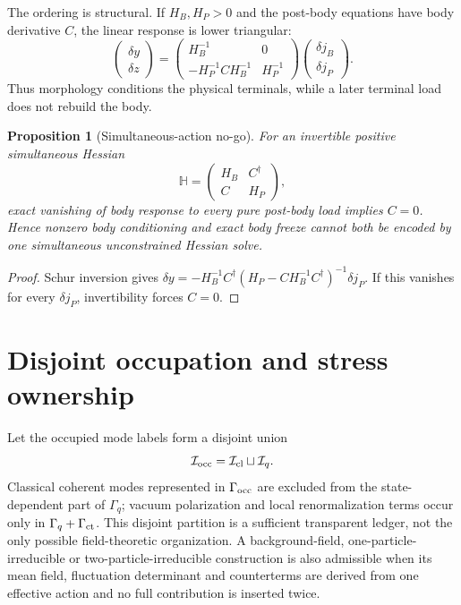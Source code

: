\documentclass[11pt]{article}
\newtheorem{proposition}{Proposition}
\begin{document}
The ordering is structural. If $H_B,H_P>0$ and the post-body equations have
body derivative $C$, the linear response is lower triangular:
\begin{equation}
\begin{pmatrix}\delta y\\\delta z\end{pmatrix}
=\begin{pmatrix}H_B^{-1}&0\\-H_P^{-1}CH_B^{-1}&H_P^{-1}\end{pmatrix}
\begin{pmatrix}\delta j_B\\\delta j_P\end{pmatrix}.
\label{eq:triangular}
\end{equation}
Thus morphology conditions the physical terminals, while a later terminal
load does not rebuild the body.

\begin{proposition}[Simultaneous-action no-go]
For an invertible positive simultaneous Hessian
\begin{equation}
\mathbb H=\begin{pmatrix}H_B&C^\dagger\\C&H_P\end{pmatrix},
\end{equation}
exact vanishing of body response to every pure post-body load implies $C=0$.
Hence nonzero body conditioning and exact body freeze cannot both be encoded
by one simultaneous unconstrained Hessian solve.
\end{proposition}
\begin{proof}
Schur inversion gives
$\delta y=-H_B^{-1}C^\dagger
(H_P-CH_B^{-1}C^\dagger)^{-1}\delta j_P$.
If this vanishes for every $\delta j_P$, invertibility forces $C=0$.
\end{proof}

\section{Disjoint occupation and stress ownership}

Let the occupied mode labels form a disjoint union
\begin{equation}
\mathcal I_{\rm occ}=\mathcal I_{\rm cl}\sqcup\mathcal I_q.
\label{eq:partition}
\end{equation}
Classical coherent modes represented in $\Gamma_{\rm occ}$ are excluded from
the state-dependent part of $\Gamma_q$; vacuum polarization and local
renormalization terms occur only in $\Gamma_q+\Gamma_{\rm ct}$.
This disjoint partition is a sufficient transparent ledger, not the only
possible field-theoretic organization. A background-field, one-particle-
irreducible or two-particle-irreducible construction is also admissible when
its mean field, fluctuation determinant and counterterms are derived from one
effective action and no full contribution is inserted twice.
\end{document}

